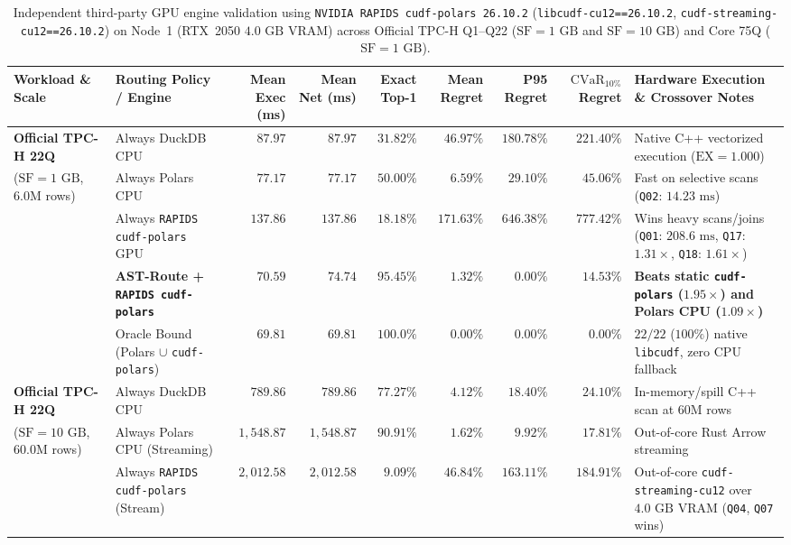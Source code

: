 \documentclass[10pt,a4paper]{article}
\begin{document}
\begin{table}[htbp]
\centering
\scriptsize
\setlength{\tabcolsep}{3.0pt}
\caption{Independent third-party GPU engine validation using \texttt{NVIDIA RAPIDS cudf-polars 26.10.2} (\texttt{libcudf-cu12==26.10.2}, \texttt{cudf-streaming-cu12==26.10.2}) on Node~1 (RTX~2050 $4.0\text{ GB}$ VRAM) across Official TPC-H Q1--Q22 ($\text{SF}=1\text{ GB}$ and $\text{SF}=10\text{ GB}$) and Core 75Q ($\text{SF}=1\text{ GB}$).}\label{tab:supp_v11_cudf_polars}
\begin{tabular}{@{}llrrrrrrl@{}}
\toprule
\textbf{Workload \& Scale} & \textbf{Routing Policy / Engine} & \textbf{Mean Exec (ms)} & \textbf{Mean Net (ms)} & \textbf{Exact Top-1} & \textbf{Mean Regret} & \textbf{P95 Regret} & \textbf{$\text{CVaR}_{10\%}$ Regret} & \textbf{Hardware Execution \& Crossover Notes} \\
\midrule
\textbf{Official TPC-H 22Q} & Always DuckDB CPU & $87.97$ & $87.97$ & $31.82\%$ & $46.97\%$ & $180.78\%$ & $221.40\%$ & Native C++ vectorized execution ($\text{EX}=1.000$) \\
($\text{SF}=1\text{ GB}$, $6.0\text{M}$ rows) & Always Polars CPU & $77.17$ & $77.17$ & $50.00\%$ & $6.59\%$ & $29.10\%$ & $45.06\%$ & Fast on selective scans (\texttt{Q02}: $14.23\text{ ms}$) \\
 & Always \texttt{RAPIDS cudf-polars} GPU & $137.86$ & $137.86$ & $18.18\%$ & $171.63\%$ & $646.38\%$ & $777.42\%$ & Wins heavy scans/joins (\texttt{Q01}: $208.6\text{ ms}$, \texttt{Q17}: $1.31\times$, \texttt{Q18}: $1.61\times$) \\
 & \textbf{AST-Route + \texttt{RAPIDS cudf-polars}} & $\mathbf{70.59}$ & $\mathbf{74.74}$ & $\mathbf{95.45\%}$ & $\mathbf{1.32\%}$ & $\mathbf{0.00\%}$ & $\mathbf{14.53\%}$ & \textbf{Beats static \texttt{cudf-polars} ($1.95\times$) and Polars CPU ($1.09\times$)} \\
 & Oracle Bound (Polars $\cup$ \texttt{cudf-polars}) & $69.81$ & $69.81$ & $100.0\%$ & $0.00\%$ & $0.00\%$ & $0.00\%$ & $22/22$ ($100\%$) native \texttt{libcudf}, zero CPU fallback \\
\midrule
\textbf{Official TPC-H 22Q} & Always DuckDB CPU & $789.86$ & $789.86$ & $77.27\%$ & $4.12\%$ & $18.40\%$ & $24.10\%$ & In-memory/spill C++ scan at $60\text{M}$ rows \\
($\text{SF}=10\text{ GB}$, $60.0\text{M}$ rows) & Always Polars CPU (Streaming) & $1{,}548.87$ & $1{,}548.87$ & $90.91\%$ & $1.62\%$ & $9.92\%$ & $17.81\%$ & Out-of-core Rust Arrow streaming \\
 & Always \texttt{RAPIDS cudf-polars} (Stream) & $2{,}012.58$ & $2{,}012.58$ & $9.09\%$ & $46.84\%$ & $163.11\%$ & $184.91\%$ & Out-of-core \texttt{cudf-streaming-cu12} over $4.0\text{ GB}$ VRAM (\texttt{Q04}, \texttt{Q07} wins) \\

\end{tabular}
\end{table}
\end{document}

